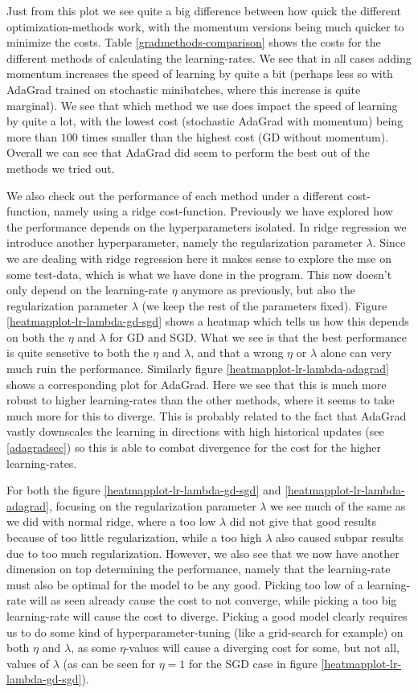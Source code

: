 \documentclass{article}
\begin{document}
Just from this plot we see quite a big difference between how quick the
different optimization-methods work, with the momentum versions being much
quicker to minimize the costs. Table \ref{gradmethods-comparison} shows the
costs for the different methods of calculating the learning-rates. We see that
in all cases adding momentum increases the speed of learning by quite a bit
(perhaps less so with AdaGrad trained on stochastic minibatches, where this
increase is quite marginal). We see that which method we use does impact the
speed of learning by quite a lot, with the lowest cost (stochastic AdaGrad with
momentum) being more than $100$ times smaller than the highest cost (GD without
momentum). Overall we can see that AdaGrad did seem to perform the best out of
the methods we tried out.

We also check out the performance of each method under a different
cost-function, namely using a ridge cost-function. Previously we have explored
how the performance depends on the hyperparameters isolated. In ridge regression
we introduce another hyperparameter, namely the regularization parameter
$\lambda$. Since we are dealing with ridge regression here it makes sense to
explore the mse on some test-data, which is what we have done in the program.
This now doesn't only depend on the learning-rate $\eta$ anymore as previously,
but also the regularization parameter $\lambda$ (we keep the rest of the
parameters fixed).  Figure \ref{heatmapplot-lr-lambda-gd-sgd} shows a heatmap
which tells us how this depends on both the $\eta$ and $\lambda$ for GD and SGD.
What we see is that the best performance is quite sensetive to both the $\eta$
and $\lambda$, and that a wrong $\eta$ or $\lambda$ alone can very much ruin the
performance. Similarly figure \ref{heatmapplot-lr-lambda-adagrad} shows a corresponding
plot for AdaGrad. Here we see that this is much more robust to higher
learning-rates than the other methods, where it seems to take much more for this
to diverge. This is probably related to the fact that AdaGrad vastly downscales
the learning in directions with high historical updates (see \ref{adagradsec})
so this is able to combat divergence for the cost for the higher learning-rates.

For both the figure \ref{heatmapplot-lr-lambda-gd-sgd} and
\ref{heatmapplot-lr-lambda-adagrad}, focusing on the regularization parameter
$\lambda$ we see much of the same as we did with normal ridge, where a too low
$\lambda$ did not give that good results because of too little regularization,
while a too high $\lambda$ also caused subpar results due to too much
regularization. However, we also see that we now have another dimension on top
determining the performance, namely that the learning-rate must also be optimal
for the model to be any good. Picking too low of a learning-rate will as seen
already cause the cost to not converge, while picking a too big learning-rate
will cause the cost to diverge. Picking a good model clearly requires us to do some
kind of hyperparameter-tuning (like a grid-search for example) on both $\eta$
and $\lambda$, as some $\eta$-values will cause a diverging cost for some, but
not all, values of $\lambda$ (as can be seen for $\eta = 1$ for the SGD case in
figure \ref{heatmapplot-lr-lambda-gd-sgd}).
\end{document}
